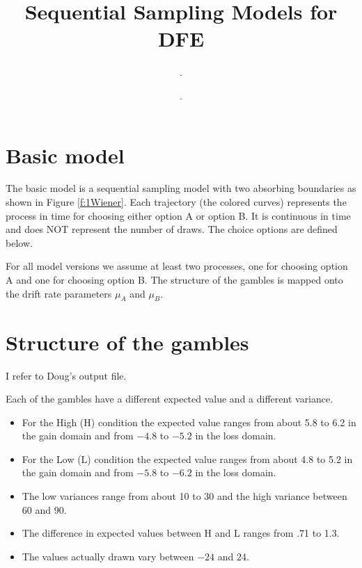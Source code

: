 \documentclass[english,doc]{apa}
\author{.} %
\affiliation{.} %
\begin{document}
\title{ Sequential Sampling Models for DFE}




\author{.} 
\maketitle
{}



\section{Basic model}
\noindent The basic model is a sequential sampling model with two absorbing boundaries as shown in Figure \ref{f:1Wiener}. Each trajectory (the colored curves) represents the process in time for choosing  either option A or option B. It is continuous in time and does NOT represent the number of draws. The choice options are defined below. 


\noindent For all model versions we assume at least two processes, one for choosing option A and one for choosing option B. The structure of the gambles is mapped onto the drift rate  parameters $\mu_A$ and $\mu_B$. 

\section{Structure of the gambles}
\noindent I refer to Doug's output file.

\noindent Each of the gambles have a different expected value and a different variance. 
\begin{itemize}
\item For the High (H) condition the expected value ranges from about 5.8 to 6.2 in the gain domain and from $-4.8$ to $-5.2$ in the loss domain.   

\item For the Low (L) condition the expected value ranges from about 4.8 to 5.2 in the gain domain and from $-5.8$ to $-6.2$ in the loss domain. 

\item The low variances range from about 10 to 30 and the high variance between 60 and 90.


\item The difference in expected values between H and L ranges from .71 to 1.3.

\item The values actually drawn vary between $-24$ and 24.
\end{itemize}
\end{document}

